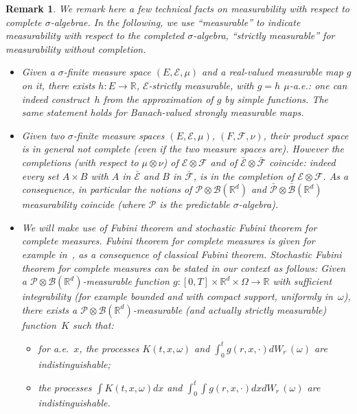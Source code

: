 \documentclass[a4paper,10pt]{article}
\newtheorem{remark}[theorem]{Remark}
\newcommand\1{\mathbbm{1}}
\newcommand{\mr}{\mathbb{R}}
\newcommand{\mc}{\mathcal}
\numberwithin{equation}{section}
\begin{document}
\begin{remark}\label{techrmk_meas}
We remark here a few technical facts on measurability with respect to complete $\sigma$-algebrae. In the following, we use ``measurable'' to indicate measurability with respect to the completed $\sigma$-algebra, ``strictly measurable'' for measurability without completion.
\begin{itemize}
\item Given a $\sigma$-finite measure space $(E,\mc{E},\mu)$ and a real-valued measurable map $g$ on it, there exists $h:E\rightarrow\mr$, $\mc{E}$-strictly measurable, with $g=h$ $\mu$-a.e.: one can indeed construct~$h$ from the approximation of $g$ by simple functions. The same statement holds for Banach-valued strongly measurable maps.
\item Given two $\sigma$-finite measure spaces $(E,\mc{E},\mu)$, $(F,\mc{F},\nu)$, their product space is in general not complete \textup{(}even if the two measure spaces are\textup{)}. However the completions \textup{(}with respect to $\mu\otimes \nu$\textup{)} of $\mc{E}\otimes\mc{F}$ and of $\bar{\mc{E}}\otimes\bar{\mc{F}}$ coincide: indeed every set $A\times B$ with $A$ in $\bar{\mc{E}}$ and $B$ in $\bar{\mc{F}}$, is in the completion of $\mc{E}\otimes\mc{F}$. As a consequence, in particular the notions of $\mc{P}\otimes \mc{B}(\mr^d)$ and $\bar{\mc{P}}\otimes \bar{\mc{B}}(\mr^d)$ measurability coincide \textup{(}where $\mc{P}$ is the predictable $\sigma$-algebra\textup{)}.
\item We will make use of Fubini theorem and stochastic Fubini theorem for complete measures. Fubini theorem for complete measures is given for example in~\textup{\cite[2.39]{Fol}}, as a consequence of classical Fubini theorem. Stochastic Fubini theorem for complete measures can be stated in our context as follows: Given a $\mc{P}\otimes \mc{B}(\mr^d)$-measurable function $g \colon [0,T]\times\mr^d\times\Omega\rightarrow \mr$ with sufficient integrability \textup{(}for example bounded and with compact support, uniformly in~$\omega$\textup{)}, there exists a $\mc{P}\otimes \mc{B}(\mr^d)$-measurable \textup{(}and actually strictly measurable\textup{)} function~$K$ such that:
\begin{itemize}
\item for a.e.~$x$, the processes $K(t,x,\omega)$ and $\int^t_0 g(r,x,\cdot) d W_r\,(\omega)$ are indistinguishable;
\item the processes $\int K(t,x,\omega) d x$ and $\int^t_0 \int g(r,x,\cdot) d x d W_r\,(\omega)$ are indistinguishable.

\end{itemize}
\end{itemize}
\end{remark}
\end{document}
